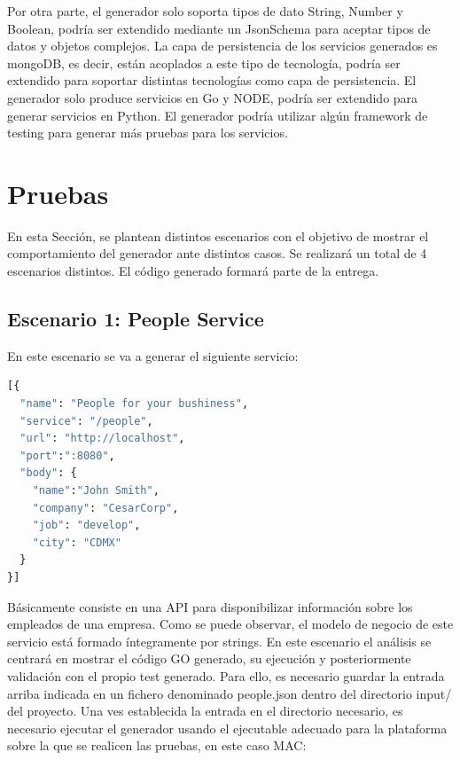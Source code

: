 \documentclass[a4paper,11pt]{book}
\begin{document}
Por otra parte, el generador solo soporta tipos de dato String, Number y Boolean, podría ser extendido mediante un JsonSchema para aceptar tipos de datos y objetos complejos. La capa de persistencia de los servicios generados es mongoDB, es decir, están acoplados a este tipo de tecnología, podría ser extendido para soportar distintas tecnologías como capa de persistencia. El generador solo produce servicios en Go y NODE, podría ser extendido para generar servicios en Python. El generador podría utilizar algún framework de testing para generar más pruebas para los servicios. 

\section{Pruebas}

En esta Sección, se plantean distintos escenarios con el objetivo de mostrar el comportamiento del generador ante distintos casos. Se realizará un total de 4 escenarios distintos. El código generado formará parte de la entrega. 


\subsection{Escenario 1: People Service}

En este escenario se va a generar el siguiente servicio:

\begin{lstlisting}[language=python,caption={ Ejemplo Entrada Generador: people.json }]
[{
  "name": "People for your bushiness",
  "service": "/people",
  "url": "http://localhost",
  "port":":8080",
  "body": {
    "name":"John Smith",
    "company": "CesarCorp",
    "job": "develop",
    "city": "CDMX"
  }
}]
\end{lstlisting}

Básicamente consiste en una API para disponibilizar información sobre los empleados de una empresa. Como se puede observar, el modelo de negocio de este servicio está formado íntegramente por strings.
En este escenario el análisis se centrará en mostrar el código GO generado, su ejecución y posteriormente validación con el propio test generado. Para ello, es necesario guardar la entrada arriba indicada en un fichero denominado people.json dentro del directorio input/ del proyecto. Una ves establecida la entrada en el directorio necesario, es necesario ejecutar el generador usando el ejecutable adecuado para la plataforma sobre la que se realicen las pruebas, en este caso MAC: 
\end{document}
